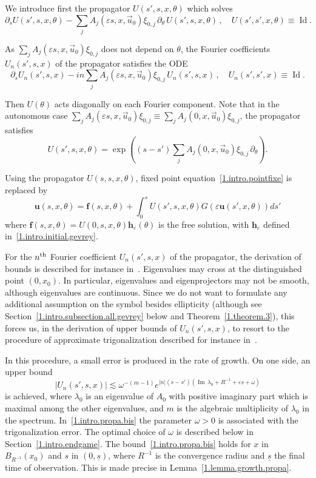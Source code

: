 \documentclass[10pt]{amsart}
\theoremstyle{definition}
\theoremstyle{plain}
\newcommand*\e{\varepsilon}
\newcommand{\dptl}{\partial}%
\newcommand{\ubf}{{\mathbf u}}
\newcommand*\f{{\mathbf f}}
\newcommand*\h{{\mathbf h}}
\newcommand*\und{\underline}
\DeclareMathOperator{\Id}{Id}
\DeclareMathOperator{\Imm}{Im}
\begin{document}
We introduce first the propagator $U(s',s,x,\theta)$ which solves
\[
\dptl_{s} U(s',s,x,\theta) - \sum_j A_j(\e s, x, \vec{u}_0)\xi_{0,j} \,\dptl_{\theta} \, U(s',s,x,\theta)\,, \quad U(s',s',x,\theta) \equiv {\Id}.
\]


As $\sum_j A_j(\e s, x, \vec{u}_0)\xi_{0,j}$ does not depend on $\theta$, the Fourier coefficients $U_n(s',s,x)$ of the propagator satisfies the ODE
\[
\dptl_{s} U_n(s',s,x) - in\sum_j A_j(\e s, x, \vec{u}_0)\xi_{0,j} \,U_n(s',s,x) \,, \quad U_n(s',s',x) \equiv {\Id}.
\]


Then $U(\theta)$ acts diagonally on each Fourier component. Note that in the autonomous case $\sum_j A_j(\e s, x, \vec{u}_0)\xi_{0,j} \equiv \sum_j A_j(0, x, \vec{u}_0)\xi_{0,j}$, the propagator satisfies
\[
U(s',s,x,\theta) = \exp \left((s-s') \sum_j A_j(0, x, \vec{u}_0)\xi_{0,j} \, \dptl_{\theta} \right).
\]


Using the propagator $U(s,s,x,\theta)$, fixed point equation~\eqref{1.intro.pointfixe} is replaced by
\begin{equation}\label{1.intro.pointfixe.full}
\ubf(s,x,\theta) = \f(s,x,\theta) + \int_{0}^{s} U(s',s,x,\theta) G(\e\ubf(s',x,\theta)) ds'
\end{equation}
where $\f(s,x,\theta) = U(0,s,x,\theta) \h_{\e}(\theta)$ is the free solution, with $\h_{\e}$ defined in~\eqref{1.intro.initial.gevrey}.

For the $n^{\rm th}$ Fourier coefficient $U_n(s',s,x)$ of the propagator, the derivation of bounds is described for instance in~\cite[Section~4]{lerner2015onset}. Eigenvalues may cross at the distinguished point $(0,x_0)$. In particular, eigenvalues and eigenprojectors may not be smooth, although eigenvalues are continuous. Since we do not want to formulate any additional assumption on the symbol besides ellipticity (although see Section~\ref{1.intro.subsection.all.gevrey} below and Theorem~\ref{1.theorem.3}), this forces us, in the derivation of upper bounds of $U_n(s',s,x)$, to resort to the procedure of approximate trigonalization described for instance in~\cite{lerner2015onset}.

In this procedure, a small error is produced in the rate of growth. On one side, an upper bound
\begin{equation}
\label{1.intro.propa.bis}
\left|U_n(s',s,x)\right| \lesssim \omega^{-(m-1)} e^{|n|(s-s') ({\Imm}\,\lambda_0 + R^{-1} + \e \und{s} + \omega)}
\end{equation}
is achieved, where $\lambda_0$ is an eigenvalue of $A_0$ with positive imaginary part which is maximal among the other eigenvalues, and $m$ is the algebraic multiplicity of $\lambda_0$ in the spectrum. In~\eqref{1.intro.propa.bis} the parameter $\omega>0$ is associated with the trigonalization error. The optimal choice of $\omega$ is described below in Section~\ref{1.intro.endgame}. The bound~\eqref{1.intro.propa.bis} holds for $x$ in $B_{R^{-1}}(x_0)$ and $s$ in $(0,\und{s})$, where $R^{-1}$ is the convergence radius and $\und{s}$ the final time of observation. This is made precise in Lemma~\ref{1.lemma.growth.propa}.
\end{document}
